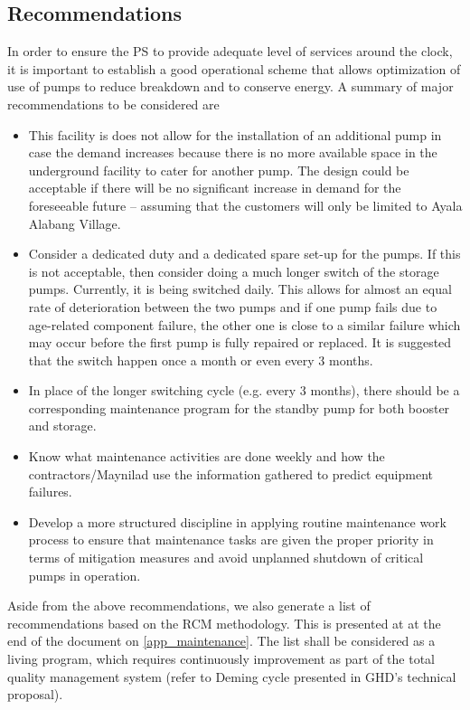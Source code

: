 \subsection{Recommendations}
In order to ensure the PS to provide adequate level of services around the clock, it is important to establish a good operational scheme that allows optimization of use of pumps to reduce breakdown and to conserve energy. A summary of major recommendations to be considered are

\begin{itemize}
	\item This facility is does not allow for the installation of an additional pump in case the demand increases because there is no more available space in the underground facility to cater for another pump.  The design could be acceptable if there will be no significant increase in demand for the foreseeable future – assuming that the customers will only be limited to Ayala Alabang Village.
	
	\item Consider a dedicated duty and a dedicated spare set-up for the pumps.  If this is not acceptable, then consider doing a much longer switch of the storage pumps.  Currently, it is being switched daily.  This allows for almost an equal rate of deterioration between the two pumps and if one pump fails due to age-related component failure, the other one is close to a similar failure which may occur before the first pump is fully repaired or replaced.  It is suggested that the switch happen once a month or even every 3 months.

	\item In place of the longer switching cycle (e.g. every 3 months), there should be a corresponding maintenance program for the standby pump for both booster and storage.

	\item Know what maintenance activities are done weekly and how the contractors/Maynilad use the information gathered to predict equipment failures. 
	
	\item Develop a more structured discipline in applying routine maintenance work process to ensure that maintenance tasks are given the proper priority in terms of mitigation measures and avoid unplanned shutdown of critical pumps in operation.
\end{itemize}

Aside from the above recommendations, we also generate a list of recommendations based on the RCM methodology. This is presented at at the end of the document on \ref{app_maintenance}. The list shall be considered as a living program, which requires continuously improvement as part of the total quality management system (refer to Deming cycle presented in GHD's technical proposal).

%



